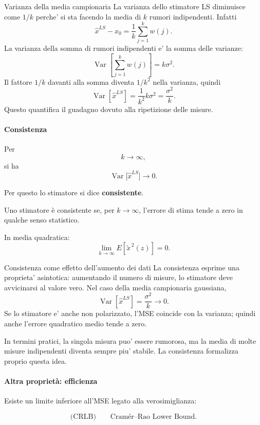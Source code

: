 \documentclass[11pt,a4paper]{article}
\begin{document}
\begin{spiegazione}{Varianza della media campionaria}
La varianza dello stimatore LS diminuisce come $1/k$ perche' si sta facendo la media di $k$ rumori indipendenti. Infatti
\[
\hat x^{LS}-x_0
=
\frac{1}{k}\sum_{j=1}^{k}w(j).
\]
La varianza della somma di rumori indipendenti e' la somma delle varianze:
\[
\operatorname{Var}\!\left[\sum_{j=1}^{k}w(j)\right]
=k\sigma^2.
\]
Il fattore $1/k$ davanti alla somma diventa $1/k^2$ nella varianza, quindi
\[
\operatorname{Var}[\hat x^{LS}]
=
\frac{1}{k^2}k\sigma^2
=
\frac{\sigma^2}{k}.
\]
Questo quantifica il guadagno dovuto alla ripetizione delle misure.
\end{spiegazione}

\paragraph{Consistenza}

Per
\[
k\to\infty,
\]
si ha
\[
\operatorname{Var}\!\bigl[\hat x^{LS}\bigr]\to 0.
\]

Per questo lo stimatore si dice \textbf{consistente}.

Uno stimatore è consistente se, per \(k\to\infty\), l'errore di stima tende a zero in qualche senso statistico.

In media quadratica:
\[
\lim_{k\to\infty} E\!\left[\tilde x^{\,2}(z)\right]=0.
\]

\begin{spiegazione}{Consistenza come effetto dell'aumento dei dati}
La consistenza esprime una proprieta' asintotica: aumentando il numero di misure, lo stimatore deve avvicinarsi al valore vero. Nel caso della media campionaria gaussiana,
\[
\operatorname{Var}[\hat x^{LS}]
=
\frac{\sigma^2}{k}
\to 0.
\]
Se lo stimatore e' anche non polarizzato, l'MSE coincide con la varianza; quindi anche l'errore quadratico medio tende a zero.

In termini pratici, la singola misura puo' essere rumorosa, ma la media di molte misure indipendenti diventa sempre piu' stabile. La consistenza formalizza proprio questa idea.
\end{spiegazione}

\paragraph{Altra proprietà: efficienza}

Esiste un limite inferiore all'MSE legato alla verosimiglianza:

\[
\text{(CRLB)} \qquad \text{Cram\'er--Rao Lower Bound}.
\]
\end{document}

